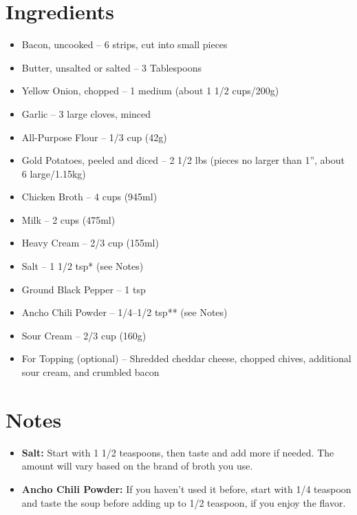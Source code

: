 




\section*{Ingredients}

\begin{itemize}
      \item[\cut] Bacon, uncooked – 6 strips, cut into small pieces
      \item Butter, unsalted or salted – 3 Tablespoons
      \item[\cut] Yellow Onion, chopped – 1 medium (about 1 1/2 cups/200g)
      \item[\cut] Garlic – 3 large cloves, minced
      \item[\measure] All-Purpose Flour – 1/3 cup (42g)
      \item[\cut] Gold Potatoes, peeled and diced – 2 1/2 lbs (pieces no larger than 1'', about 6 large/1.15kg)
      \item Chicken Broth – 4 cups (945ml)
      \item[\measure] Milk – 2 cups (475ml)
      \item[\measure] Heavy Cream – 2/3 cup (155ml)
      \item[\measure] Salt – 1 1/2 tsp* (see Notes)
      \item[\measure] Ground Black Pepper – 1 tsp
      \item[\measure] Ancho Chili Powder – 1/4--1/2 tsp** (see Notes)
      \item[\measure] Sour Cream – 2/3 cup (160g)
      \item For Topping (optional) – Shredded cheddar cheese, chopped chives, additional sour cream, and crumbled bacon
\end{itemize}

\section*{Notes}

\begin{itemize}
      \item[*] \textbf{Salt:} Start with 1 1/2 teaspoons, then taste and add more if needed. The amount will vary based on the brand of broth you use.
      \item[**] \textbf{Ancho Chili Powder:} If you haven't used it before, start with 1/4 teaspoon and taste the soup before adding up to 1/2 teaspoon, if you enjoy the flavor.
\end{itemize}

